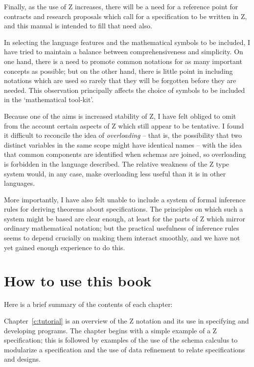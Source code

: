 Finally, as the use of Z increases, there will be a need for a
reference point for contracts and research proposals which call
for a specification to be written in Z, and this manual is intended
to fill that need also.

In selecting the language features and the mathematical symbols to be
included, I have tried to maintain a balance between
comprehensiveness and simplicity. On one hand, there is a need to promote
common notations for as many important concepts as possible; but on the
other hand, there is little point in including notations which are used
so rarely that they will be forgotten before they are needed. This
observation principally affects the choice of symbols to be included in
the `mathematical tool-kit'.

Because one of the aims is increased stability of Z, I have felt
obliged to omit from the account certain aspects of Z which still
appear to be tentative. I found it difficult to reconcile the idea of
{\em overloading\/} -- that is, the
possibility that two distinct variables in the same scope might have
identical names -- with the idea that common components are
identified when schemas are joined, so overloading is forbidden in
the language described.  The relative weakness of the Z type system
would, in any case, make overloading less useful than it is in other
languages.

More importantly, I have also felt unable to include a system of
formal inference rules for deriving theorems
about specifications.  The principles on which such a system might be
based are clear enough, at least for the parts of Z which mirror
ordinary mathematical notation; but the practical usefulness of
inference rules seems to depend crucially on making them interact
smoothly, and we have not yet gained enough experience to do this.

\section*{How to use this book}

Here is a brief summary of the contents of each chapter:

Chapter~\ref{c:tutorial} is an overview of the Z notation and its use
in specifying and developing programs. The chapter begins with a
simple example of a Z specification; this is followed by examples of
the use of the schema calculus to modularize a specification and the
use of data refinement to relate specifications and designs.

